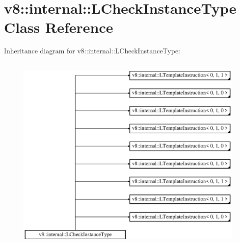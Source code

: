 \hypertarget{classv8_1_1internal_1_1_l_check_instance_type}{}\section{v8\+:\+:internal\+:\+:L\+Check\+Instance\+Type Class Reference}
\label{classv8_1_1internal_1_1_l_check_instance_type}
Inheritance diagram for v8\+:\+:internal\+:\+:L\+Check\+Instance\+Type\+:\begin{figure}[H]
\begin{center}
\leavevmode
\includegraphics[height=10.000000cm]{classv8_1_1internal_1_1_l_check_instance_type}
\end{center}
\end{figure}

